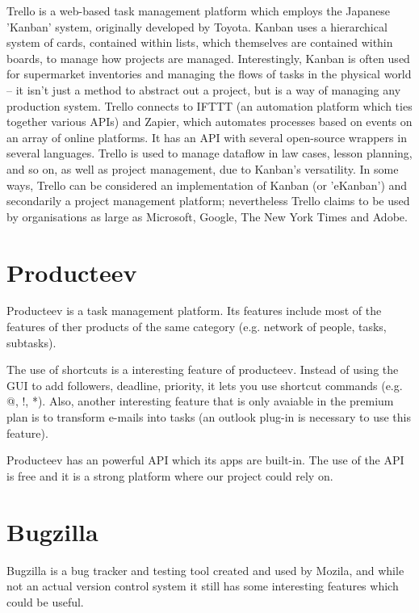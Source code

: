 \documentclass{l3proj}
\begin{document}
Trello is a web-based task management platform which employs the Japanese 'Kanban'
system, originally developed by Toyota. Kanban uses a hierarchical system of
cards, contained within lists, which themselves are contained within boards, to
manage how projects are managed. Interestingly, Kanban is often used for
supermarket inventories and managing the flows of tasks in the physical world --
it isn't just a method to abstract out a project, but is a way of managing any
production system.
Trello connects to IFTTT (an automation platform which ties together various APIs)
and Zapier, which automates processes based on events on an array of online
platforms. It has an API with several open-source wrappers in several languages.
Trello is used to manage dataflow in law cases, lesson planning, and so on, as
well as project management, due to Kanban's versatility.
In some ways, Trello can be considered an implementation of Kanban (or 'eKanban')
and secondarily a project management platform; nevertheless Trello claims to be
used by organisations as large as Microsoft, Google, The New York Times and
Adobe. 


\section{Producteev}
\label{producteev}

Producteev is a task management platform. Its features include most of the features of ther products of the same category (e.g. network of people, tasks, subtasks).

The use of shortcuts is a interesting feature of producteev. Instead of using the GUI to add followers, deadline, priority, it lets you use shortcut commands (e.g. @, !, *). Also, another interesting feature that is only avaiable in the premium plan is to transform e-mails into tasks (an outlook plug-in is necessary to use this feature).

Producteev has an powerful API which its apps are built-in. The use of the API is free and it is a strong platform where our project could rely on.


\section{Bugzilla}
\label{Bugzilla}

Bugzilla is a bug tracker and testing tool created and used by Mozila,
and while not an actual version control system it still has some
interesting features which could be useful.
\end{document}
